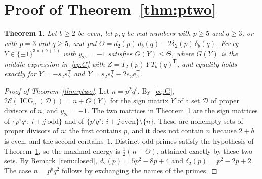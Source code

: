 \documentclass[11pt]{article}
\newtheorem{theorem}{Theorem}
\theoremstyle{remark}
\newcommand{\ICG}{\operatorname{ICG}}
\newcommand{\E}{\mathcal E}
\begin{document}
\section{Proof of Theorem~\ref{thm:ptwo}}\label{sec:ptwo}
\begin{theorem}\label{thm:signB}
Let $b\ge2$ be even, let $p,q$ be real numbers with $p\ge5$ and $q\ge3$, or
with $p=3$ and $q\ge5$, and put
$\Theta=d_2(p)\,d_b(q)-2\delta_2(p)\,\delta_b(q)$. Every
$Y\in\{\pm1\}^{3\times(b+1)}$ with $y_{2b}=-1$ satisfies $G(Y)\le\Theta$,
where $G(Y)$ is the middle expression in~\eqref{eq:G} with
$Z=T_2(p)\,Y\,T_b(q)^{\mathsf T}$, and equality holds exactly for
$Y=-s_2s_b^{\mathsf T}$ and $Y=s_2s_b^{\mathsf T}-2e_2e_b^{\mathsf T}$.
\end{theorem}

\begin{proof}[Proof of Theorem~\ref{thm:ptwo}]
Let $n=p^2q^b$. By~\eqref{eq:G}, $2\E(\ICG_n(\mathcal D))=n+G(Y)$ for the sign
matrix $Y$ of a set $\mathcal D$ of proper divisors of $n$, and $y_{2b}=-1$.
The two matrices in Theorem~\ref{thm:signB} are the sign matrices of
$\{p^iq^j:\ i+j\ \text{odd}\}$ and of
$\{p^iq^j:\ i+j\ \text{even}\}\setminus\{n\}$. These are nonempty sets of
proper divisors of $n$: the first contains $p$, and it does not contain $n$
because $2+b$ is even, and the second contains~$1$. Distinct odd primes
satisfy the hypothesis of Theorem~\ref{thm:signB}, so the maximal energy is
$\frac12(n+\Theta)$, attained exactly by these two sets. By
Remark~\ref{rem:closed}, $d_2(p)=5p^2-8p+4$ and $\delta_2(p)=p^2-2p+2$. The
case $n=p^bq^2$ follows by exchanging the names of the primes.
\end{proof}
\end{document}
